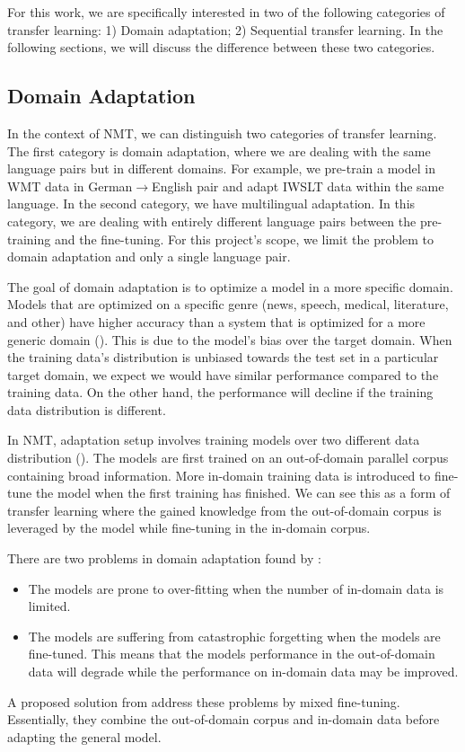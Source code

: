 For this work, we are specifically interested in two of the following categories of transfer learning: 1) Domain adaptation; 2) Sequential transfer learning. In the following sections, we will discuss the difference between these two categories.

\subsection{Domain Adaptation}
\label{sec:domain_adapt}
In the context of NMT, we can distinguish two categories of transfer learning. The first category is domain adaptation, where we are dealing with the same language pairs but in different domains. For example, we pre-train a model in WMT data in German$\rightarrow$English pair and adapt IWSLT data within the same language. In the second category, we have multilingual adaptation. In this category, we are dealing with entirely different language pairs between the pre-training and the fine-tuning. For this project's scope, we limit the problem to domain adaptation and only a single language pair.

The goal of domain adaptation is to optimize a model in a more specific domain. Models that are optimized on a specific genre (news, speech, medical, literature, and other) have higher accuracy than a system that is optimized for a more generic domain (\cite{gao2002improving,hildebrand2005adaptation}). This is due to the model's bias over the target domain. When the training data's distribution is unbiased towards the test set in a particular target domain, we expect we would have similar performance compared to the training data. On the other hand, the performance will decline if the training data distribution is different.

In NMT, adaptation setup involves training models over two different data distribution (\cite{luong2015stanford,Servan2016DomainSA,Chu2018ASO}). The models are first trained on an out-of-domain parallel corpus containing broad information. More in-domain training data is introduced to fine-tune the model when the first training has finished. We can see this as a form of transfer learning where the gained knowledge from the out-of-domain corpus is leveraged by the model while fine-tuning in the in-domain corpus.

There are two problems in domain adaptation found by \cite{Freitag2016FastDA}:
\begin{itemize}
    \item The models are prone to over-fitting when the number of in-domain data is limited.
    \item The models are suffering from catastrophic forgetting when the models are fine-tuned. This means that the models performance in the out-of-domain data will degrade while the performance on in-domain data may be improved.
\end{itemize}
A proposed solution from \cite{Chu2017AnEC} address these problems by mixed fine-tuning. Essentially, they combine the out-of-domain corpus and in-domain data before adapting the general model.

